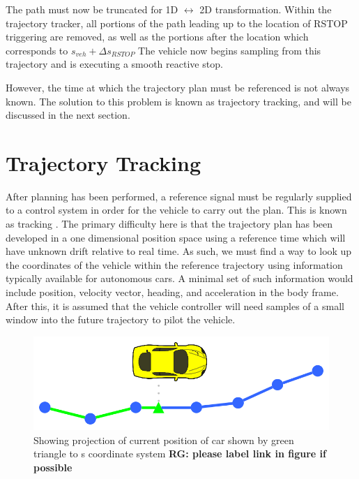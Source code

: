 \documentclass[letterpaper, 10 pt, conference]{ieeeconf}  %
\begin{document}
The path must now be truncated for 1D $\leftrightarrow$ 2D transformation.
Within the trajectory tracker, all portions of the path leading up to the location of RSTOP triggering are removed, as well as the portions after the location which corresponds to $s_{veh} + \Delta s_{RSTOP}$
The vehicle now begins sampling from this trajectory and is executing a smooth reactive stop.


However, the time at which the trajectory plan must be referenced is not always known.
The solution to this problem is known as trajectory tracking, and will be discussed in the next section.



\section{Trajectory Tracking} \label{sec:trajectorytracking}

After planning has been performed, a reference signal must be regularly supplied to a control system in order for the vehicle to carry out the plan.
This is known as tracking .
The primary difficulty here is that the trajectory plan has been developed in a one dimensional position space using a reference time which will have unknown drift relative to real time.
As such, we must find a way to look up the coordinates of the vehicle within the reference trajectory using information typically available for autonomous cars.
A minimal set of such information would include position, velocity vector, heading, and acceleration in the body frame.
After this, it is assumed that the vehicle controller will need samples of a small window into the future trajectory to pilot the vehicle.

\begin{figure}[thpb]
  \centering
  \includegraphics[width=0.5\columnwidth]{graphics/PathProjection.png}
  \caption{Showing projection of current position of car shown by green triangle to s coordinate system
   \textbf{ RG: please label link in figure if possible} }

  \label{fig:cartos}
\end{figure}
\end{document}
